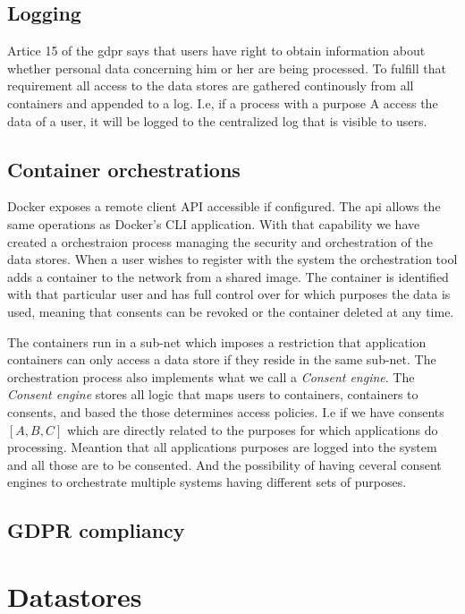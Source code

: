 \documentclass[USenglish]{uit-thesis}
\begin{document}
\subsection{Logging}
Artice 15 of the \gls{gdpr} says that users have right to obtain information
about whether personal data concerning him or her are being processed.
To fulfill that requirement all access to the data stores are gathered continously
from all containers and appended to a log.
I.e, if a process with a purpose A access the data of a user, it will be logged to
the centralized log that is visible to users.

\subsection{Container orchestrations}
Docker exposes a remote client API accessible if configured.
The \gls{api} allows the same operations as Docker's CLI application.
With that capability we have created a orchestraion process managing the
security and orchestration of the data stores.
When a user wishes to register with the system the orchestration tool
adds a container to the network from a shared image.
The container is identified with that particular user and has full control over
for which purposes the data is used, meaning that consents can be revoked or the
container deleted at any time.

The containers run in a sub-net which imposes a restriction that application containers
can only access a data store if they reside in the same sub-net.
The orchestration process also implements what we call a \textit{Consent engine}.
The \textit{Consent engine} stores all logic that maps users to containers,
containers to consents, and based the those determines access policies.
I.e if we have consents $ [A, B, C] $ which are directly related to the purposes
for which applications do processing.
Meantion that all applications purposes are logged into the system and all those are
to be consented. And the possibility of having ceveral consent engines to orchestrate
multiple systems having different sets of purposes.

\subsection{GDPR compliancy}

\section{Datastores}



\end{document}
